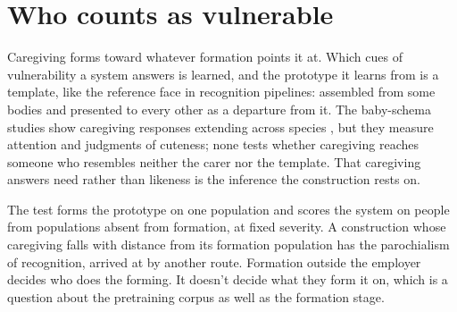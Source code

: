 \section{Who counts as vulnerable}
\label{sec:23.7}
Caregiving forms toward whatever formation points it at. Which cues of vulnerability a system answers is learned, and the prototype it learns from is a template, like the reference face in recognition pipelines: assembled from some bodies and presented to every other as a departure from it. The baby-schema studies show caregiving responses extending across species \autocite{glocker2009baby,borgi2014baby}, but they measure attention and judgments of cuteness; none tests whether caregiving reaches someone who resembles neither the carer nor the template. That caregiving answers need rather than likeness is the inference the construction rests on.

The test forms the prototype on one population and scores the system on people from populations absent from formation, at fixed severity. A construction whose caregiving falls with distance from its formation population has the parochialism of recognition, arrived at by another route. Formation outside the employer decides who does the forming. It doesn't decide what they form it on, which is a question about the pretraining corpus as well as the formation stage.
